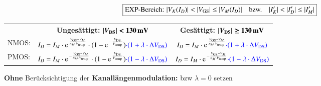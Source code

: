 \[ \boxed{ \text{EXP-Bereich: } |V_K(I_D)| < |V_{\rm GS}| \leq |V_M(I_D)| \quad \text{bzw.} \quad |I_K'| < |I_D'| \leq |I_M'| } \]  %


\resizebox{\columnwidth}{!}
{
    \renewcommand{\arraystretch}{1.5}
    \begin{tabular}{@{}l c | c@{}}
                & \textbf{Ungesättigt:} \quad $\bm{| V_{\rm DS} | < 130 \, \mathrm{mV}}$                                                                                                  & \textbf{Gesättigt:} \quad $\bm{| V_{\rm DS} | \geq 130 \, \mathrm{mV}}$                                                             \\
        NMOS:   & $I_D = I_M \cdot \e^{\frac{V_{\rm GS} - V_M}{n_M \cdot V_\text{temp}}} \cdot (1 - \e^{-\frac{V_{\rm DS}}{V_\text{temp}}}) \cbl{\cdot (1 + \lambda \cdot \Delta V_{\rm DS})}$  & $I_D = I_M \cdot \e^{\frac{V_{\rm GS} - V_M}{n_M \cdot V_\text{temp}}} \cbl{\cdot (1 + \lambda \cdot \Delta V_{\rm DS})}$     \\
        \midrule
        PMOS:   & $I_D = I_M \cdot \e^{- \frac{V_{\rm GS} - V_M}{n_M \cdot V_\text{temp}}} \cdot (1 - \e^{\frac{V_{\rm DS}}{V_\text{temp}}}) \cbl{\cdot (1 - \lambda \cdot \Delta V_{\rm DS})}$ & $I_D = I_M \cdot \e^{- \frac{V_{\rm GS} - V_M}{n_M \cdot V_\text{temp}}} \cbl{\cdot (1 - \lambda \cdot \Delta V_{\rm DS})}$   \\
    \end{tabular}
    \renewcommand{\arraystretch}{1}
}

\medskip

\textbf{Ohne} Berücksichtigung der \textbf{Kanallängenmodulation:}  bzw $\lambda = 0$ setzen






